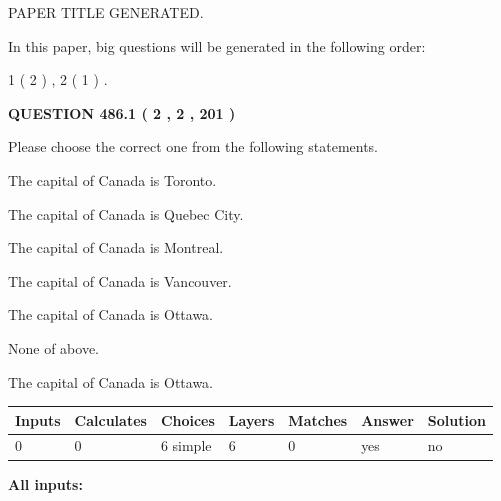 \documentclass[12pt]{article}
\begin{document}
   
 PAPER TITLE GENERATED.
   
   
   
\vspace{0.2in}
   
In this paper, big questions will be generated in the following order: 
   
   
   1 ( 2 )
 ,
   2 ( 1 )
 .
  
\vspace{0.2in}
  
{\textbf{\Large{QUESTION
486.1 
 ( 2 , 2 , 201 )
}}}
  
  
Please choose the correct one from the following statements.
 
 
The capital of Canada is Toronto.
 
 
The capital of Canada is Quebec City.
 
 
The capital of Canada is Montreal.
 
 
The capital of Canada is Vancouver.
 
 
The capital of Canada is Ottawa.
 
 
 None of above.
 
 
\noindent{}
 
 
The capital of Canada is Ottawa.
 
 
\noindent{}
 
 
   
   
   
   
\noindent\begin{tabular}{|l|l|l|l|l|l|l|}
 \hline
Inputs & Calculates & Choices & Layers & Matches & Answer & Solution \\ \hline
 0  & 
 0  & 
 6
  simple  
  & 
 6  & 
 0  & 
  yes & 
  no 
  \\ \hline
 \end{tabular}
   
   
   
   
\noindent{}
   
   
   
   
\noindent\vspace{0.1in}\hspace{-0.08in} {\textbf{\Large{All inputs: }}}
   
\end{document}
